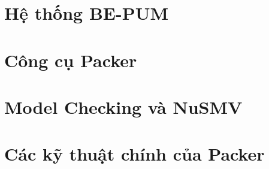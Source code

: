\section{Hệ thống BE-PUM}

\section{Công cụ Packer}

\section{Model Checking và NuSMV}

\section{Các kỹ thuật chính của Packer}